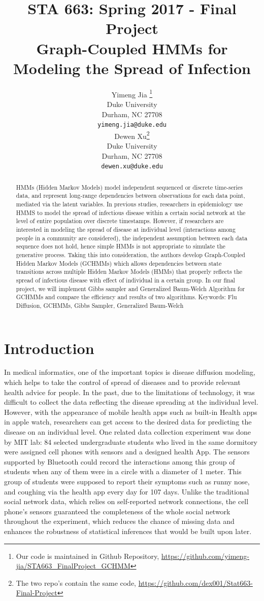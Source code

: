 \documentclass{article} %
\title{STA 663: Spring 2017 - Final Project\\Graph-Coupled HMMs for Modeling the Spread of Infection}
\author{
Yimeng Jia \thanks{Our code is maintained in Github Repository, \textcolor{blue}{\url{https://github.com/yimeng-jia/STA663_FinalProject_GCHMM}}}\\
Duke University\\
Durham, NC 27708 \\
\texttt{yimeng.jia@duke.edu} \\
\And
Dewen Xu\thanks{The two repo's contain the same code, \textcolor{blue}{\url{https://github.com/dex001/Stat663-Final-Project}}} \\
Duke University \\
Durham, NC 27708 \\
\texttt{dewen.xu@duke.edu} \\
}
\begin{document}
\maketitle




\begin{abstract}
HMMs (Hidden Markov Models) model independent sequenced or discrete time-series data, and represent long-range dependencies between observations for each data point, mediated via the latent variables. In previous studies, researchers in epidemiology use HMMS to model the spread of infectious disease within a certain social network at the level of entire population over discrete timestamps. However, if researchers are interested in modeling the spread of disease at individual level (interactions among people in a community are considered), the independent assumption between each data sequence does not hold, hence simple HMMs is not appropriate to simulate the generative process. Taking this into consideration, the authors develop Graph-Coupled Hidden Markov Models (GCHMMs) which allows dependencies between state transitions across multiple Hidden Markov Models (HMMs) that properly reflects the spread of infectious disease with effect of individual in a certain group. In our final project, we will implement Gibbs sampler and Generalized Baum-Welch Algorithm for GCHMMs and compare the efficiency and results of two algorithms.
Keywords:  Flu Diffusion, GCHMMs, Gibbs Sampler, Generalized Baum-Welch
\end{abstract}

\section{Introduction}
In medical informatics, one of the important topics is disease diffusion modeling, which helps to take the control of spread of diseases and to provide relevant health advice for people. In the past, due to the limitations of technology, it was difficult to collect the data reflecting the disease spreading at the individual level. However, with the appearance of mobile health apps such as built-in Health apps in apple watch, researchers can get access to the desired data for predicting the disease on an individual level. One related data collection experiment was done by MIT lab: 84 selected undergraduate students who lived in the same dormitory were assigned cell phones with sensors and a designed health App. The sensors supported by Bluetooth could record the interactions among this group of students when any of them were in a circle with a diameter of 1 meter. This group of students were supposed to report their symptoms such as runny nose, and coughing via the health app every day for 107 days.  Unlike the traditional social network data, which relies on self-reported network connections, the cell phone’s sensors guaranteed the completeness of the whole social network throughout the experiment, which reduces the chance of missing data and enhances the robustness of statistical inferences that would be built upon later.	
\end{document}

